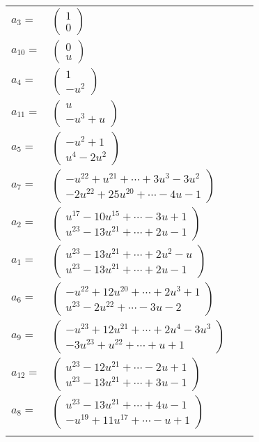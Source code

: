 \documentclass[1p]{elsarticle_modified}
\theoremstyle{definition}
\begin{document}
\begin{tabular}{m{7pt} m{180pt} m{7pt} m{180pt} }
\flushright $a_{3}=$&$\begin{pmatrix}1\\0\end{pmatrix}$ \\
\flushright $a_{10}=$&$\begin{pmatrix}0\\u\end{pmatrix}$ \\
\flushright $a_{4}=$&$\begin{pmatrix}1\\- u^2\end{pmatrix}$ \\
\flushright $a_{11}=$&$\begin{pmatrix}u\\- u^3+u\end{pmatrix}$ \\
\flushright $a_{5}=$&$\begin{pmatrix}- u^2+1\\u^4-2 u^2\end{pmatrix}$ \\
\flushright $a_{7}=$&$\begin{pmatrix}- u^{22}+u^{21}+\cdots+3 u^3-3 u^2\\-2 u^{22}+25 u^{20}+\cdots-4 u-1\end{pmatrix}$ \\
\flushright $a_{2}=$&$\begin{pmatrix}u^{17}-10 u^{15}+\cdots-3 u+1\\u^{23}-13 u^{21}+\cdots+2 u-1\end{pmatrix}$ \\
\flushright $a_{1}=$&$\begin{pmatrix}u^{23}-13 u^{21}+\cdots+2 u^2- u\\u^{23}-13 u^{21}+\cdots+2 u-1\end{pmatrix}$ \\
\flushright $a_{6}=$&$\begin{pmatrix}- u^{22}+12 u^{20}+\cdots+2 u^3+1\\u^{23}-2 u^{22}+\cdots-3 u-2\end{pmatrix}$ \\
\flushright $a_{9}=$&$\begin{pmatrix}- u^{23}+12 u^{21}+\cdots+2 u^4-3 u^3\\-3 u^{23}+u^{22}+\cdots+u+1\end{pmatrix}$ \\
\flushright $a_{12}=$&$\begin{pmatrix}u^{23}-12 u^{21}+\cdots-2 u+1\\u^{23}-13 u^{21}+\cdots+3 u-1\end{pmatrix}$ \\
\flushright $a_{8}=$&$\begin{pmatrix}u^{23}-13 u^{21}+\cdots+4 u-1\\- u^{19}+11 u^{17}+\cdots- u+1\end{pmatrix}$\\&\end{tabular}
\end{document}
